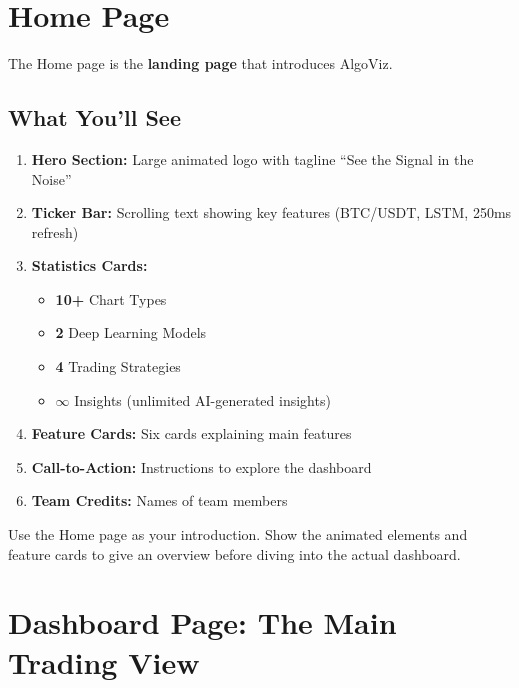 \documentclass[12pt,a4paper]{article}
\begin{document}
\section{Home Page}

The Home page is the \textbf{landing page} that introduces AlgoViz.

\subsection{What You'll See}

\begin{enumerate}
    \item \textbf{Hero Section:} Large animated logo with tagline ``See the Signal in the Noise''
    \item \textbf{Ticker Bar:} Scrolling text showing key features (BTC/USDT, LSTM, 250ms refresh)
    \item \textbf{Statistics Cards:} 
    \begin{itemize}
        \item \textbf{10+} Chart Types
        \item \textbf{2} Deep Learning Models
        \item \textbf{4} Trading Strategies
        \item \textbf{$\infty$} Insights (unlimited AI-generated insights)
    \end{itemize}
    \item \textbf{Feature Cards:} Six cards explaining main features
    \item \textbf{Call-to-Action:} Instructions to explore the dashboard
    \item \textbf{Team Credits:} Names of team members
\end{enumerate}

\begin{tipbox}
Use the Home page as your introduction. Show the animated elements and feature cards to give an overview before diving into the actual dashboard.
\end{tipbox}

\section{Dashboard Page: The Main Trading View}
\end{document}
